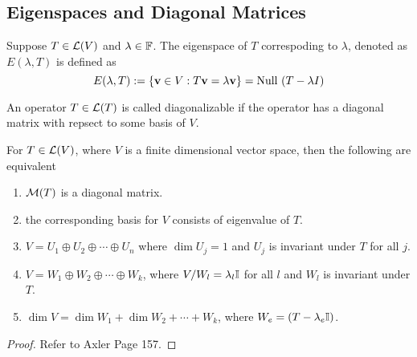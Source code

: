 \subsection{Eigenspaces and Diagonal Matrices}
\begin{definition}
    Suppose $T \in \mathcal L(V)$ and $\lambda \in \mathbb F$. The eigenspace of $T$ correspoding to $\lambda$, denoted as $E(\lambda, T)$ is defined as 
    \[ E(\lambda, T) := \left\{ \mathbf v \in V : T\mathbf v = \lambda \mathbf v \right\} = \text{Null } (T - \lambda I)\]
\end{definition}
\begin{definition}
    An operator $T \in \mathcal L(T)$ is called diagonalizable if the operator has a diagonal matrix with repsect to some basis of $V$.
\end{definition}
\begin{theorem}
    For $T \in \mathcal L(V)$, where $V$ is a finite dimensional vector space, then the following are equivalent
    \begin{enumerate}
        \item $\mathcal M(T)$ is a diagonal matrix.
        \item the corresponding basis for $V$ consists of eigenvalue of $T$.
        \item $V = U_1 \oplus U_2 \oplus \cdots \oplus U_n$ where $\dim U_j = 1$ and $U_j$ is invariant under $T$ for all $j$.
        \item $V = W_1 \oplus W_2 \oplus \cdots \oplus W_k$, where $V/W_l = \lambda_l \mathbb I$ for all $l$ and $W_l$ is invariant under $T$.
        \item $\dim V = \dim W_1 + \dim W_2 + \cdots + W_k$, where $W_e = \null (T - \lambda_e \b I)$.
    \end{enumerate}
\end{theorem}
\begin{proof}
Refer to Axler Page 157.
\end{proof}









